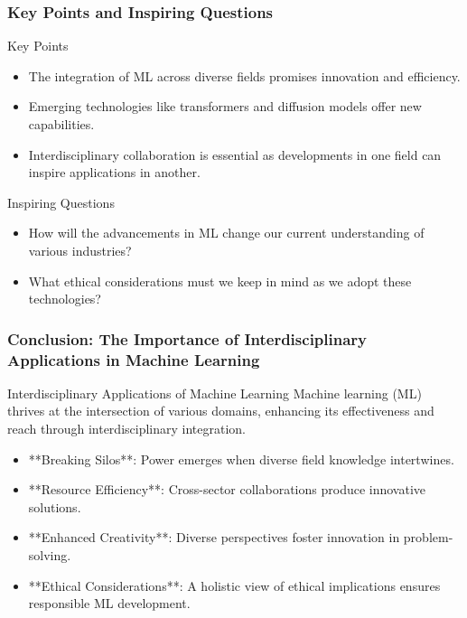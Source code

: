 \documentclass[aspectratio=169]{beamer}
\begin{document}
\begin{frame}[fragile]
    \frametitle{Key Points and Inspiring Questions}
    \begin{block}{Key Points}
        \begin{itemize}
            \item The integration of ML across diverse fields promises innovation and efficiency.
            \item Emerging technologies like transformers and diffusion models offer new capabilities.
            \item Interdisciplinary collaboration is essential as developments in one field can inspire applications in another.
        \end{itemize}
    \end{block}

    \begin{alertblock}{Inspiring Questions}
        \begin{itemize}
            \item How will the advancements in ML change our current understanding of various industries?
            \item What ethical considerations must we keep in mind as we adopt these technologies?
        \end{itemize}
    \end{alertblock}
\end{frame}

\begin{frame}[fragile]
    \frametitle{Conclusion: The Importance of Interdisciplinary Applications in Machine Learning}
    
    \begin{block}{Interdisciplinary Applications of Machine Learning}
        Machine learning (ML) thrives at the intersection of various domains, enhancing its effectiveness and reach through interdisciplinary integration.
    \end{block}
    
    \begin{itemize}
        \item **Breaking Silos**: Power emerges when diverse field knowledge intertwines.
        \item **Resource Efficiency**: Cross-sector collaborations produce innovative solutions.
        \item **Enhanced Creativity**: Diverse perspectives foster innovation in problem-solving.
        \item **Ethical Considerations**: A holistic view of ethical implications ensures responsible ML development.
    \end{itemize}
\end{frame}
\end{document}
